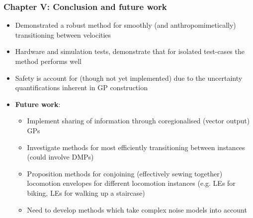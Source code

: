 \documentclass[aspectratio=169]{beamer}
\begin{document}
\begin{frame}
    \frametitle{Chapter V: Conclusion and future work}
    \begin{itemize}
        \item Demonstrated a robust method for smoothly (and anthropomimetically) transitioning between velocities 
        \item Hardware and simulation tests, demonstrate that for isolated test-cases the method performs well
        \item Safety is account for (though not yet implemented) due to the uncertainty quantifications inherent in GP
           construction 
        \item {\bf Future work}: 
            \begin{itemize}
                \item Implement sharing of information through coregionalised (vector output) GPs
                \item Investigate methods for most efficiently transitioning between instances (could involve DMPs)
                \item Proposition methods for conjoining (effectively sewing together) locomotion envelopes for
                    different locomotion instances (e.g. LEs for biking, LEs for walking up a staircase) 
                \item Need to develop methods which take complex noise models into account
            \end{itemize}
    \end{itemize}
\end{frame}

\end{document}
